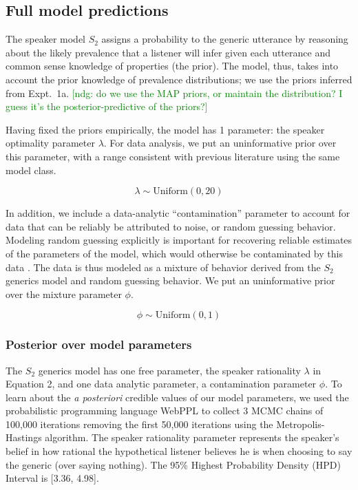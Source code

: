 \documentclass[10pt,letterpaper]{article}
\newcommand{\ndg}[1]{\textcolor{Green}{[ndg: #1]}}
\begin{document}
\subsection{Full model predictions}

The speaker model $S_2$ assigns a probability to the generic utterance by reasoning about the likely prevalence that a listener will infer given each utterance and common sense knowledge of properties (the prior). 
The model, thus, takes into account the prior knowledge of prevalence distributions; we use the priors inferred from Expt.~1a. \ndg{do we use the MAP priors, or maintain the distribution? I guess it's the posterior-predictive of the priors?}


Having fixed the priors empirically, the model has 1 parameter: the speaker optimality parameter $\lambda$. 
For data analysis, we put an uninformative prior over this parameter, with a range consistent with previous literature using the same model class.

$$
\lambda \sim \text{Uniform}(0,20)
$$

In addition, we include a data-analytic ``contamination'' parameter to account for data that can be reliably be attributed to noise, or random guessing behavior.
Modeling random guessing explicitly is important for recovering reliable estimates of the parameters of the model, which would otherwise be contaminated by this data \cite{LW2014}.
The data is thus modeled as a mixture of behavior derived from the $S_2$ generics model and random guessing behavior. 
We put an uninformative prior over the mixture parameter $\phi$.

$$
\phi \sim \text{Uniform}(0,1)
$$


\subsubsection{Posterior over model parameters}

The $S_2$ generics model has one free parameter, the speaker rationality $\lambda$ in Equation 2, and one data analytic parameter, a contamination parameter $\phi$.
To learn about the \emph{a posteriori} credible values of our model parameters, we used the probabilistic programming language WebPPL \cite{dippl} to collect 3 MCMC chains of 100,000 iterations removing the first 50,000 iterations using the Metropolis-Hastings algorithm. 
The speaker rationality parameter represents the speaker's belief in how rational the hypothetical listener believes he is when choosing to say the generic (over saying nothing). 
The 95\% Highest Probability Density (HPD) Interval is [3.36, 4.98].
\end{document}

